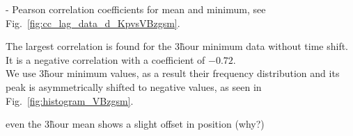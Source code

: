 \Kp{}-\vBz{} Pearson correlation coefficients for mean and minimum, see Fig.~\ref{fig:cc_lag_data_d_KpvsVBzgsm}.\\
\begin{figure}
\end{figure}
The largest correlation is found for the 3\~hour minimum data without time shift. It is a negative correlation with a coefficient of $-0.72$.\\

We use \vBz{} 3\~hour minimum values, as a result their frequency distribution and its peak is asymmetrically shifted to negative values, as seen in Fig.~\ref{fig:histogram_VBzgsm}.\\
\begin{figure}
\end{figure}
even the 3\~hour mean shows a slight offset in position (why?)\\


